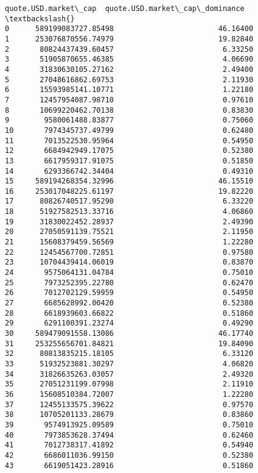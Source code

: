 \documentclass[11pt]{article}
\begin{document}
\begin{tcolorbox}[breakable, size=fbox, boxrule=.5pt, pad at break*=1mm, opacityfill=0]
\begin{Verbatim}[commandchars=\\\{\}]
     quote.USD.market\_cap  quote.USD.market\_cap\_dominance  \textbackslash{}
0      589199083727.85498                        46.16400
1      253076870556.74979                        19.82840
2       80824437439.60457                         6.33250
3       51905870655.46385                         4.06690
4       31830630105.27162                         2.49400
5       27048616862.69753                         2.11930
6       15593985141.10771                         1.22180
7       12457954087.98710                         0.97610
8       10699220462.70138                         0.83830
9        9580061488.83877                         0.75060
10       7974345737.49799                         0.62480
11       7013522530.95964                         0.54950
12       6684942949.17075                         0.52380
13       6617959317.91075                         0.51850
14       6293366742.34404                         0.49310
15     589194268354.32996                        46.15510
16     253017048225.61197                        19.82220
17      80826740517.95290                         6.33220
18      51927582513.33716                         4.06860
19      31830022452.28937                         2.49390
20      27050591139.75521                         2.11950
21      15608379459.56569                         1.22280
22      12454567700.72851                         0.97580
23      10704439414.06019                         0.83870
24       9575064131.04784                         0.75010
25       7973252395.22780                         0.62470
26       7012702129.59959                         0.54950
27       6685628992.00420                         0.52380
28       6618939603.66822                         0.51860
29       6291100391.23274                         0.49290
30     589479091558.13086                        46.17740
31     253255656701.84821                        19.84090
32      80813835215.18105                         6.33120
33      51932523881.30297                         4.06820
34      31826635263.03057                         2.49320
35      27051231199.07998                         2.11910
36      15608510384.72007                         1.22280
37      12455133575.39622                         0.97570
38      10705201133.28679                         0.83860
39       9574913925.09589                         0.75010
40       7973853628.37494                         0.62460
41       7012738317.41892                         0.54940
42       6686011036.99150                         0.52380
43       6619051423.28916                         0.51860

\end{Verbatim}
\end{tcolorbox}
\end{document}
